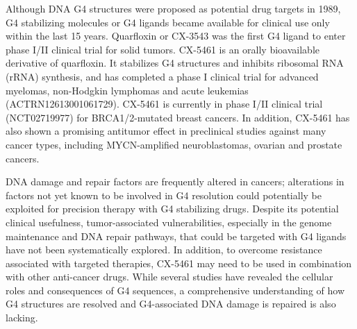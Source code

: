 Although DNA G4 structures were proposed as potential drug targets in 1989\cite{Hurley1989a}, G4 stabilizing molecules or G4 ligands became available for clinical use only within the last 15 years. Quarfloxin or CX-3543 was the first G4 ligand to enter phase I/II clinical trial for solid tumors\cite{Drygin2009}. CX-5461 is an orally bioavailable derivative of quarfloxin. It stabilizes G4 structures and inhibits ribosomal RNA (rRNA) synthesis, and has completed a phase I clinical trial for advanced myelomas, non-Hodgkin lymphomas and acute leukemias (ACTRN12613001061729)\cite{Drygin2011,Haddach2012,Bywater2012,Khot2017,Xu2017}. CX-5461 is currently in phase I/II clinical trial (NCT02719977) for BRCA1/2-mutated breast cancers\cite{Xu2017}. In addition, CX-5461 has also shown a promising antitumor effect in preclinical studies against many cancer types, including MYCN-amplified neuroblastomas, ovarian and prostate cancers\cite{Negi2015a,Lee2017,Hein2017,Hald2018,Cornelison2017,Rebello2016}. 

DNA damage and repair factors are frequently altered in cancers; alterations in factors not yet known to be involved in G4 resolution could potentially be exploited for precision therapy with G4 stabilizing drugs. Despite its potential clinical usefulness, tumor-associated vulnerabilities, especially in the genome maintenance and DNA repair pathways, that could be targeted with G4 ligands have not been systematically explored. In addition, to overcome resistance associated with targeted therapies, CX-5461 may need to be used in combination with other anti-cancer drugs. While several studies have revealed the cellular roles and consequences of G4 sequences, a comprehensive understanding of how G4 structures are resolved and G4-associated DNA damage is repaired is also lacking.  

